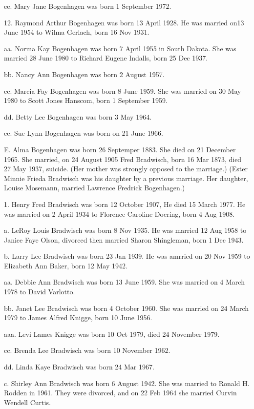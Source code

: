 \documentclass[a4paper]{article}
\begin{document}
ee. Mary Jane Bogenhagen was born 1 September 1972. 	

12. Raymond Arthur Bogenhagen was born 13 April 1928.  He was married on13 June 1954 to Wilma Gerlach, born 16 Nov 1931.

aa. Norma Kay Bogenhagen was born 7 April 1955 in South Dakota.  She was married 28 June 1980 to Richard Eugene Indalls, born 25 Dec 1937.
 
bb. Nancy Ann Bogenhagen was born 2 August 1957.

cc. Marcia Fay Bogenhagen was born 8 June 1959.  She was married on 30 May 1980 to Scott Jones Hanscom, born 1 September 1959.
 
dd. Betty Lee Bogenhagen was born 3 May 1964.

ee. Sue Lynn Bogenhagen was born on 21 June 1966.

E. Alma Bogenhagen was born 26 Septemper 1883. She died on 21 December 1965. She married, on 24 August 1905 Fred Bradwisch, born 16 Mar 1873, died 27 May 1937, suicide.  (Her mother was strongly opposed to the marriage.)    (Ester Minnie Frieda Bradwisch was his daughter by a previous marriage.  Her daughter, Louise Mosemann, married Lawrence Fredrick Bogenhagen.)  

1. Henry  Fred Bradwisch was born 12 October 1907,  He died 15 March 1977. He was married on 2 April 1934 to Florence Caroline Doering, born 4 Aug 1908.
 
a. LeRoy Louis Bradwisch was born 8 Nov 1935.  He was married 12 Aug 1958 to Janice Faye Olson, divorced then married Sharon Shingleman, born 1 Dec 1943.

b. Larry Lee Bradwisch was born 23 Jan 1939.  He was amrried on 20 Nov 1959 to Elizabeth Ann Baker, born 12 May 1942.
 
aa. Debbie Ann Bradwisch was born 13 June 1959.  She was married on 4 March 1978 to David Varlotto.
 
bb. Janet Lee Bradwisch was born 4 October 1960.  She was married on 24 March 1979 to James Alfred Knigge, born 10 June 1956.
 
aaa. Levi Lames Knigge was born 10 Oct 1979, died 24 November 1979.
 
cc. Brenda Lee Bradwisch was born 10 November 1962.

dd. Linda Kaye Bradwisch was born 24 Mar 1967.

c. Shirley Ann Bradwisch was born 6 August 1942.  She was married to Ronald H. Rodden in 1961.  They were divorced, and on 22 Feb 1964 she married Curvin Wendell Curtis.
 
\end{document}
